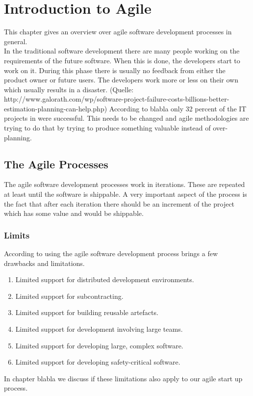 \chapter{Introduction to Agile}
This chapter gives an overview over agile software development processes in general.\\

In the traditional software development there are many people working on the requirements of the future software. When this is done, the developers start to work on it. During this phase there is usually no feedback from either the product owner or future users. The developers work more or less on their own which usually results in a disaster. (Quelle: http://www.galorath.com/wp/software-project-failure-costs-billions-better-estimation-planning-can-help.php) According to blabla only 32 percent of the IT projects in were successful. This needs to be changed and agile methodologies are trying to do that by trying to produce something valuable instead of over-planning.

\section{The Agile Processes}
The agile software development processes work in iterations. These are repeated at least until the software is shippable. A very important aspect of the process is the fact that after each iteration there should be an increment of the project which has some value and would be shippable.


\subsection{Limits}
According to \cite{turk2002limitations} using the agile software development process brings a few drawbacks and limitations. 
\begin{enumerate}
\item Limited support for distributed development environments.
\item Limited support for subcontracting.
\item Limited support for building reusable artefacts.
\item Limited support for development involving large teams.
\item Limited support for developing large, complex software.
\item Limited support for developing safety-critical software.
\end{enumerate}
In chapter blabla we discuss if these limitations also apply to our agile start up process.

\cite{scrum_linda}